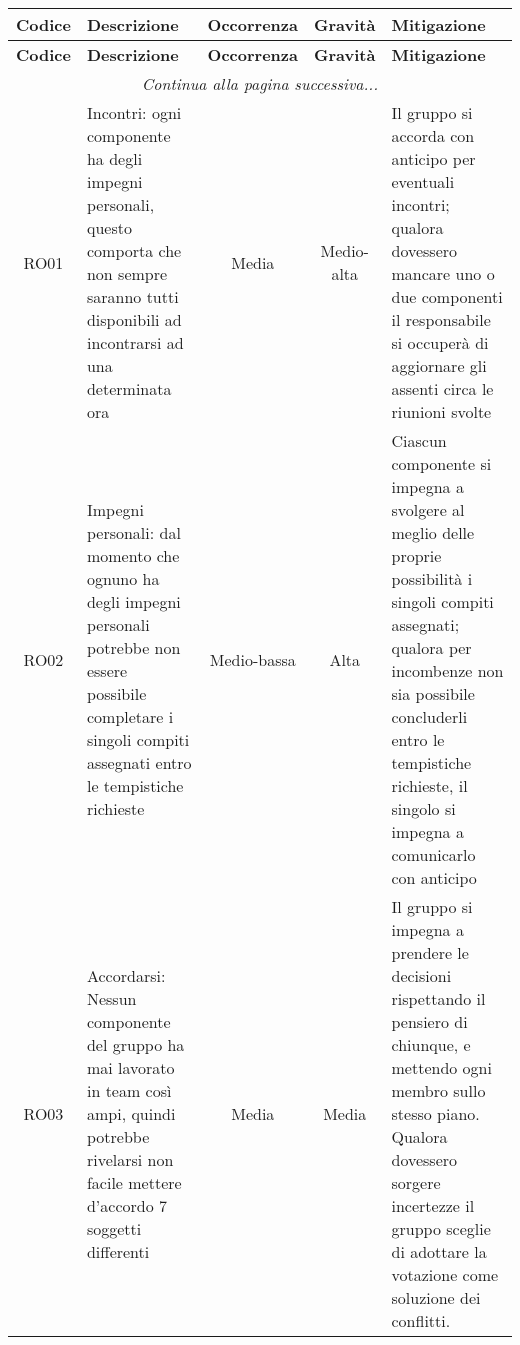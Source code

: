 \documentclass[../piano_di_progetto.tex]{subfiles}
\begin{document}
\begin{center}
	\begin{longtable}{|c|p{4.5cm}|c|c|p{4.5cm}|}
		\hline
		\rowcolor{lightgray}
		{\textbf{Codice}} & {\textbf{Descrizione}} & {\textbf{Occorrenza}} & {\textbf{Gravità}} & {\textbf{Mitigazione}}\\
		\hline

		\endfirsthead
	
		\hline
		\rowcolor{lightgray}
		{\textbf{Codice}} & {\textbf{Descrizione}} & {\textbf{Occorrenza}} & {\textbf{Gravità}} & {\textbf{Mitigazione}}\\
		\hline
		\endhead
		
		\hline
		\multicolumn{5}{|c|}{\emph{Continua alla pagina successiva...}}\\
		\hline
		\endfoot

		\endlastfoot

		RO01              &
		Incontri: ogni componente ha degli impegni personali, questo comporta che non sempre saranno tutti disponibili ad incontrarsi ad una determinata ora
		                  &
		Media
		                  &
		Medio-alta
		                  &
		Il gruppo si accorda con anticipo per eventuali incontri; qualora dovessero mancare uno o due componenti il responsabile si occuperà di aggiornare gli assenti circa le riunioni svolte                                                         \\
		
		RO02              &
		Impegni personali: dal momento che ognuno ha degli impegni personali potrebbe non essere possibile completare i singoli compiti assegnati entro le tempistiche richieste
		                  &
		Medio-bassa
		                  &
		Alta
		                  &
		Ciascun componente si impegna a svolgere al meglio delle proprie possibilità i singoli compiti assegnati; qualora per incombenze non sia possibile concluderli entro le tempistiche richieste, il singolo si impegna a comunicarlo con anticipo \\
		
		RO03              &
		Accordarsi: Nessun componente del gruppo ha mai lavorato in team così ampi, quindi potrebbe rivelarsi non facile mettere d’accordo 7 soggetti differenti
		                  &
		Media
		                  &
		Media
		                  &
		Il gruppo si impegna a prendere le decisioni rispettando il pensiero di chiunque, e mettendo ogni membro sullo stesso piano. Qualora dovessero sorgere incertezze il gruppo sceglie di adottare la votazione come soluzione dei conflitti.      \\
		

\end{longtable}
\end{center}
\end{document}
